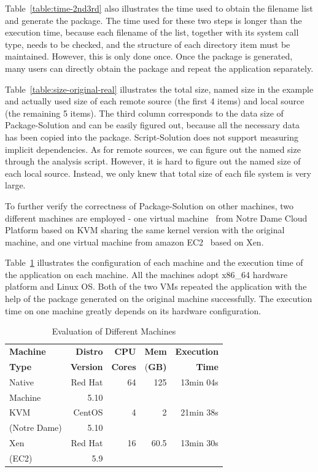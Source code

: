 \documentclass{sig-alternate}
\begin{document}
Table~\ref{table:time-2nd3rd} also illustrates the time used to
obtain the filename list and generate the package. 
The time used for these two steps is longer than the execution time,
because each filename of the list, together with its system call type, needs to be checked, and the structure of each directory item must be maintained.
However, 
this is only done once.
Once the package is
generated, many users can directly obtain the package and repeat the application 
separately. 

Table~\ref{table:size-original-real} illustrates the total size, named size in the example and actually used size of each remote source (the first 4 items) and local source (the remaining 5 items).
The third column corresponds to the data size of Package-Solution and can be easily figured out, because all the necessary data has been copied into the package.
Script-Solution does not support measuring implicit dependencies. As for remote sources, we can figure out the named size through the analysis script. However, it is hard to figure out the named size of each local source. 
Instead, we only knew that total size of each file system is very large.

To further verify the correctness of Package-Solution on other machines, two different machines are employed -
one virtual
machine~\cite{goldberg1974survey} from Notre Dame Cloud Platform based on KVM sharing the same kernel version with the original machine,
and one virtual machine from amazon EC2~\cite{amazon2010amazon} based on Xen.

Table~\ref{table:config-vm} illustrates the configuration of 
each machine and the execution time of the application on each machine.
All the machines adopt x86\_64 hardware platform and Linux OS.
Both of the two VMs repeated the application with the help of the package generated on the original machine successfully.
The execution time on one machine greatly depends on its hardware configuration.

\begin{table}
    \centering
    \begin{tabular}{|l|r|r|r|r|}
    \hline
    \bf Machine & \bf Distro & \bf CPU & \bf Mem & \bf Execution\\ 
    \bf Type   &\bf Version&\bf Cores & (\bf GB) & \bf Time\\ \hline
    Native &  Red Hat  & 64 & 125 & 13min 04s\\  
    Machine& 5.10 &&&\\ \hline
    KVM & CentOS & 4 & 2 & 21min 38s\\
    (Notre Dame)&5.10 &&&\\ \hline
    Xen & Red Hat & 16 & 60.5 & 13min 30s\\ 
    (EC2) &5.9 &&&\\ \hline
    \end{tabular}
    \caption{Evaluation of Different Machines}
    \label{table:config-vm}
\end{table}
\end{document}
